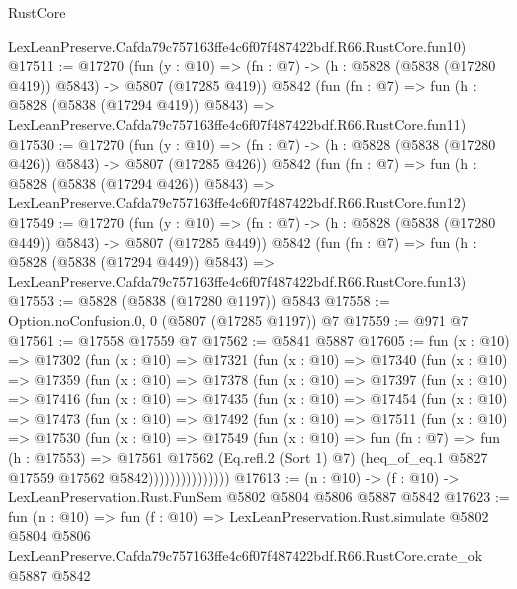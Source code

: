\begin{lexlean}{RustCore}
\begin{coremodule}
    LexLeanPreserve.Cafda79c757163ffe4c6f07f487422bdf.R66.RustCore.fun10)
@17511 := @17270
    (fun (y : @10) => (fn : @7) -> (h : @5828 (@5838 (@17280 @419)) @5843) -> @5807 (@17285 @419))
    @5842
    (fun (fn : @7) =>
    fun (h : @5828 (@5838 (@17294 @419)) @5843) =>
    LexLeanPreserve.Cafda79c757163ffe4c6f07f487422bdf.R66.RustCore.fun11)
@17530 := @17270
    (fun (y : @10) => (fn : @7) -> (h : @5828 (@5838 (@17280 @426)) @5843) -> @5807 (@17285 @426))
    @5842
    (fun (fn : @7) =>
    fun (h : @5828 (@5838 (@17294 @426)) @5843) =>
    LexLeanPreserve.Cafda79c757163ffe4c6f07f487422bdf.R66.RustCore.fun12)
@17549 := @17270
    (fun (y : @10) => (fn : @7) -> (h : @5828 (@5838 (@17280 @449)) @5843) -> @5807 (@17285 @449))
    @5842
    (fun (fn : @7) =>
    fun (h : @5828 (@5838 (@17294 @449)) @5843) =>
    LexLeanPreserve.Cafda79c757163ffe4c6f07f487422bdf.R66.RustCore.fun13)
@17553 := @5828 (@5838 (@17280 @1197)) @5843
@17558 := Option.noConfusion.{0, 0} (@5807 (@17285 @1197)) @7
@17559 := @971 @7
@17561 := @17558 @17559 @7
@17562 := @5841 @5887
@17605 := fun (x : @10) =>
  @17302
    (fun (x : @10) =>
    @17321
      (fun (x : @10) =>
      @17340
        (fun (x : @10) =>
        @17359
          (fun (x : @10) =>
          @17378
            (fun (x : @10) =>
            @17397
              (fun (x : @10) =>
              @17416
                (fun (x : @10) =>
                @17435
                  (fun (x : @10) =>
                  @17454
                    (fun (x : @10) =>
                    @17473
                      (fun (x : @10) =>
                      @17492
                        (fun (x : @10) =>
                        @17511
                          (fun (x : @10) =>
                          @17530
                            (fun (x : @10) =>
                            @17549
                              (fun (x : @10) =>
                              fun (fn : @7) =>
                              fun (h : @17553) =>
                              @17561
                                @17562
                                (Eq.refl.{2} (Sort 1) @7)
                                (heq_of_eq.{1} @5827 @17559 @17562 @5842)))))))))))))))
@17613 := (n : @10) -> (f : @10) -> LexLeanPreservation.Rust.FunSem @5802 @5804 @5806 @5887 @5842
@17623 := fun (n : @10) =>
  fun (f : @10) =>
  LexLeanPreservation.Rust.simulate
    @5802
    @5804
    @5806
    LexLeanPreserve.Cafda79c757163ffe4c6f07f487422bdf.R66.RustCore.crate_ok
    @5887
    @5842
\end{coremodule}
\end{lexlean}
